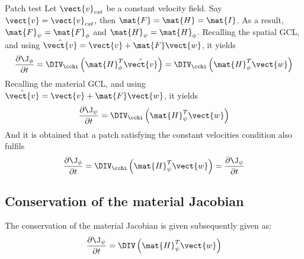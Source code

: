 \begin{note}{Patch test} \newline
Let $\vect{v}_{cst}$ be a constant velocity field. \newline
Say $\vect{v} = \vect{v}_{cst}$, then $\mat{F} = \mat{H} = \mat{I}$. \newline
As a result, $\mat{F}_{\psi} = \mat{F}_{\phi}$ and $\mat{H}_{\psi} = \mat{H}_{\phi}$. \newline 
Recalling the spatial GCL, and using $\hat{\vect{v}} = \vect{v} + \mat{F}\vect{w}$, it yields
\begin{equation*}
    \frac{\partial \J_{\phi}}{\partial t} = \DIV_{\cchi} \left( \mat{H}_{\phi}^T  \hat{\vect{v}}\right) = \DIV_{\cchi} \left( \mat{H}_{\phi}^T  \vect{w}\right)
\end{equation*}
Recalling the material GCL, and using $\hat{\vect{v}} = \vect{v} + \mat{F}\vect{w}$, it yields
\begin{equation*}
	\frac{\partial \J_{\psi}}{\partial t} = \DIV_{\cchi} \left( \mat{H}_{\psi}^T  \vect{w}\right)
\end{equation*}
And it is obtained that a patch satisfying the constant velocities condition also fulfils
\begin{equation*}
	 \frac{\partial \J_{\phi}}{\partial t} = \DIV_{\cchi} \left( \mat{H}_{\psi}^T  \vect{w}\right) = \frac{\partial \J_{\psi}}{\partial t}
\end{equation*}
\end{note}
%
\subsection{Conservation of the material Jacobian}
The conservation of the material Jacobian is given subsequently given as:
\begin{equation}
	\frac{\partial \J_{\psi}}{\partial t} = \DIV \left( \mat{H}_{\psi}^T \vect{w} \right)
\end{equation}
%
